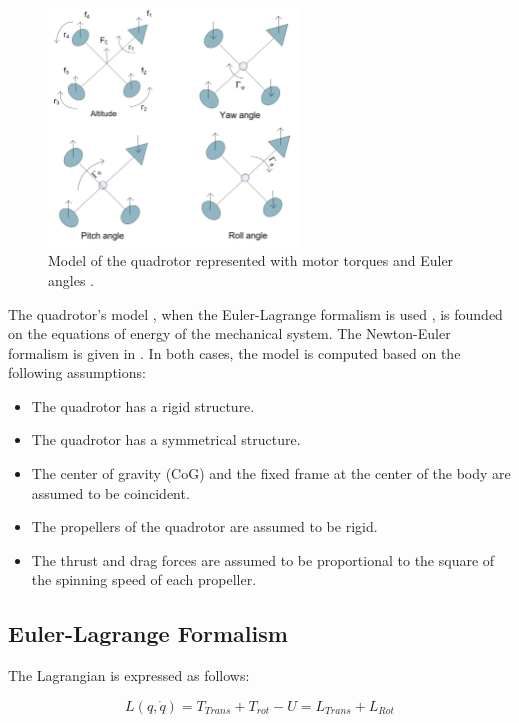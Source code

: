 \documentclass{thesisreport}
\begin{document}
\begin{figure}[h]
\centering
\includegraphics[width=0.6\textwidth]{Images/Modeling/Fantoni_a}
\caption{Model of the quadrotor represented with motor torques and Euler angles \cite{Fantoni2016}.}
\label{Fantoni_a}
\end{figure}

The quadrotor's model \cite{Bouabdalla2007}, when the Euler-Lagrange formalism is used \cite{houston_2001}, is founded on the equations of energy of the mechanical system. The Newton-Euler formalism is given in \cite{Murray1994}. In both cases, the model is computed based on the following assumptions:

\begin{itemize}
	\item The quadrotor has a rigid structure.
	\item The quadrotor has a symmetrical structure.
	\item The center of gravity (CoG) and the fixed frame at the center of the body are assumed to be coincident.
	\item The propellers of the quadrotor are assumed to be rigid.
	\item The thrust and drag forces are assumed to be proportional to the square of the spinning speed of each propeller.
\end{itemize}


\newpage

\subsection{Euler-Lagrange Formalism}

The Lagrangian is expressed as follows:

\begin{equation}
	L(q,\dot{q}) = T_{Trans} + T_{rot} - U = L_{Trans} + L_{Rot}
\end{equation}
\end{document}
